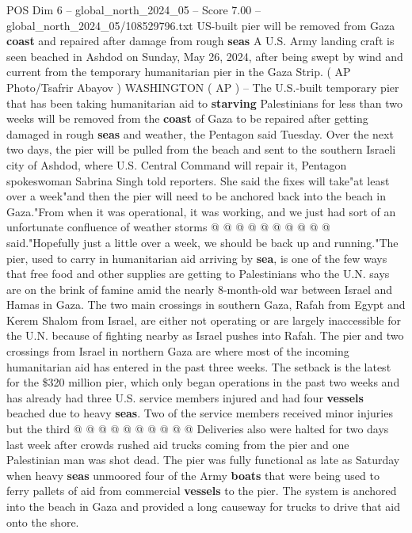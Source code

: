 \begin{textsample}{POS Dim 6 – global\_north\_2024\_05 – Score 7.00 – global\_north\_2024\_05/108529796.txt}  \label{ex:f6_pos_168}
US-built pier will be removed from Gaza \textbf{coast} and repaired after damage from rough \textbf{seas} A U.S.
Army landing craft is seen beached in Ashdod on Sunday, May 26, 2024, after being swept by wind and current from the temporary humanitarian pier in the Gaza Strip. ( AP Photo/Tsafrir Abayov ) WASHINGTON ( AP ) -- The U.S.-built temporary pier that has been taking humanitarian aid to \textbf{starving} Palestinians for less than two weeks will be removed from the \textbf{coast} of Gaza to be repaired after getting damaged in rough \textbf{seas} and weather, the Pentagon said Tuesday.
Over the next two days, the pier will be pulled from the beach and sent to the southern Israeli city of Ashdod, where U.S.
Central Command will repair it, Pentagon spokeswoman Sabrina Singh told reporters.
She said the fixes will take"at least over a week"and then the pier will need to be anchored back into the beach in Gaza."From when it was operational, it was working, and we just had sort of an unfortunate confluence of weather storms @ @ @ @ @ @ @ @ @ @ said."Hopefully just a little over a week, we should be back up and running."The pier, used to carry in humanitarian aid arriving by \textbf{sea}, is one of the few ways that free food and other supplies are getting to Palestinians who the U.N. says are on the brink of famine amid the nearly 8-month-old war between Israel and Hamas in Gaza.
The two main crossings in southern Gaza, Rafah from Egypt and Kerem Shalom from Israel, are either not operating or are largely inaccessible for the U.N. because of fighting nearby as Israel pushes into Rafah.
The pier and two crossings from Israel in northern Gaza are where most of the incoming humanitarian aid has entered in the past three weeks.
The setback is the latest for the \$320 million pier, which only began operations in the past two weeks and has already had three U.S. service members injured and had four \textbf{vessels} beached due to heavy \textbf{seas}.
Two of the service members received minor injuries but the third @ @ @ @ @ @ @ @ @ @ Deliveries also were halted for two days last week after crowds rushed aid trucks coming from the pier and one Palestinian man was shot dead.
The pier was fully functional as late as Saturday when heavy \textbf{seas} unmoored four of the Army \textbf{boats} that were being used to ferry pallets of aid from commercial \textbf{vessels} to the pier.
The system is anchored into the beach in Gaza and provided a long causeway for trucks to drive that aid onto the shore.

\end{textsample}
